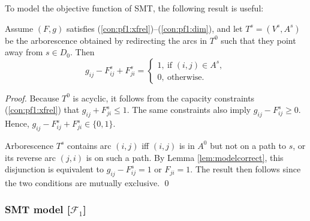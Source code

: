 To model the objective function of SMT, the following result is useful:
\begin{prop}\label{prop:transx}
Assume $(F,g)$ satisfies (\ref{con:pf1:xfrel})--(\ref{con:pf1:dim}),
and let $T^s=(V^s,A^s)$ be the arborescence obtained by redirecting the arcs in $T^0$ such that they point away from $s\in D_0$. Then
$$
g_{ij} - F^s_{ij}+F^s_{ji} = 
	\begin{cases}
		1, ~\text{if $(i,j)\in A^s$}, \\
		0, ~\text{otherwise.}
	\end{cases}
$$
\end{prop}
%
\begin{proof}
Because $T^0$ is acyclic, it follows from the capacity constraints (\ref{con:pf1:xfrel}) that $g_{ij}+F^s_{ji}\leq 1$.
The same constraints also imply $g_{ij} - F^s_{ij}\geq 0$.
Hence, $g_{ij} - F^s_{ij}+F^s_{ji}\in\{0,1\}$.

Arborescence $T^s$ contains arc $(i,j)$ iff $(i,j)$ is in $A^0$ but not on a path to $s$, or its reverse arc $(j,i)$ is on such a path.
By Lemma \ref{lem:modelcorrect}, this disjunction is equivalent to $g_{ij}-F_{ij}^s=1$ or $F_{ji}=1$.
The result then follows since the two conditions are mutually exclusive.
\qed
\end{proof}


\subsubsection{SMT model [$\mathcal{F}_1$]}

